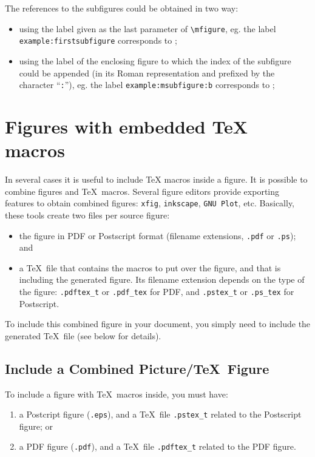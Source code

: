 \documentclass[book,taskpackage,specpackage,codepackage]{upmethodology-document}
\begin{document}
The references to the subfigures could be obtained in two way:\nopagebreak\begin{itemize}
\item using the label given as the last parameter of \texttt{{\textbackslash}mfigure}, eg. the label \texttt{example:firstsubfigure} corresponds to ;
\item using the label of the enclosing figure to which the index of the subfigure could be appended (in its Roman representation and prefixed by the character ``\texttt{:}''), eg. the label \texttt{example:msubfigure:b} corresponds to ;
\end{itemize}

\section{Figures with embedded \TeX\xspace macros}

In several cases it is useful to include \TeX\xspace macros inside a figure. It is possible to combine figures and \TeX\ macros. Several figure editors provide exporting features to obtain combined figures: \texttt{xfig}, \texttt{inkscape}, \texttt{GNU Plot}, etc. Basically, these tools create two files per source figure: \begin{itemize}
\item the figure in PDF or Postscript format (filename extensions, \texttt{.pdf} or \texttt{.ps}); and
\item a \TeX\ file that contains the macros to put over the figure, and that is including the generated figure. Its filename extension depends on the type of the figure: \texttt{.pdftex\_t} or \texttt{.pdf\_tex} for PDF, and \texttt{.pstex\_t} or \texttt{.ps\_tex} for Postscript.
\end{itemize}
To include this combined figure in your document, you simply need to include the generated \TeX\ file (see below for details).

\subsection{Include a Combined Picture/\TeX\ Figure}

To include a figure with \TeX\ macros inside, you must have: \begin{enumerate}
\item a Postcript figure (\texttt{.eps}), and a \TeX\ file \texttt{.pstex\_t} related to the Postscript figure; or
\item a PDF figure (\texttt{.pdf}), and a \TeX\ file \texttt{.pdftex\_t} related to the PDF figure.
\end{enumerate}
\end{document}

